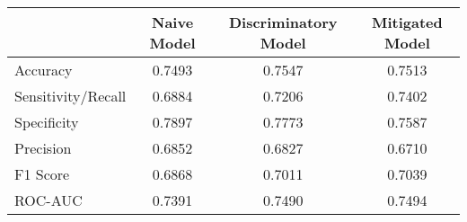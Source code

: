 \begin{tabular}{lccc}
\toprule
{} &  Naive Model &  Discriminatory Model &  Mitigated Model \\
\midrule
Accuracy           &       0.7493 &                0.7547 &           0.7513 \\
Sensitivity/Recall &       0.6884 &                0.7206 &           0.7402 \\
Specificity        &       0.7897 &                0.7773 &           0.7587 \\
Precision          &       0.6852 &                0.6827 &           0.6710 \\
F1 Score           &       0.6868 &                0.7011 &           0.7039 \\
ROC-AUC            &       0.7391 &                0.7490 &           0.7494 \\
\bottomrule
\end{tabular}
